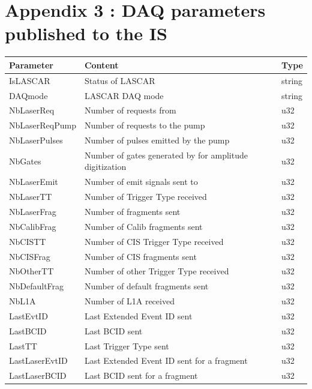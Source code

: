 \pagebreak[4]

\part*{Appendix 3 : DAQ parameters published to the IS}
\label{app:c}

\begin{table}[htbp]
  \begin{center}
    \begin{tabular}{lll}
      \hline\hline
      Parameter & Content & Type \\
      \hline
      IsLASCAR & Status of LASCAR & string \\
      DAQmode & LASCAR DAQ mode & string \\
      NbLaserReq & Number of \las{} requests from \shaft{} & u32 \\
      NbLaserReqPump & Number of \las{} requests to the pump & u32 \\
      NbLaserPulses & Number of \las{} pulses emitted by the pump & u32 \\
      NbGates & Number of gates generated by \lascar{} for amplitude digitization & u32 \\
      NbLaserEmit & Number of \las{} emit signals sent to \shaft{} & u32 \\
      NbLaserTT & Number of \las{} Trigger Type received & u32 \\
      NbLaserFrag & Number of \las{} fragments sent & u32 \\
      NbCalibFrag & Number of Calib fragments sent & u32 \\
      NbCISTT & Number of CIS Trigger Type received & u32 \\
      NbCISFrag & Number of CIS fragments sent & u32 \\
      NbOtherTT & Number of other Trigger Type received & u32 \\
      NbDefaultFrag & Number of default fragments sent & u32 \\
      NbL1A & Number of L1A received & u32 \\
      LastEvtID & Last Extended Event ID sent & u32 \\
      LastBCID & Last BCID sent & u32 \\
      LastTT & Last Trigger Type sent & u32 \\
      LastLaserEvtID & Last Extended Event ID sent for a \las{} fragment & u32 \\
      LastLaserBCID & Last BCID sent for a \las{} fragment & u32 \\

\end{tabular}
\end{center}
\end{table}
